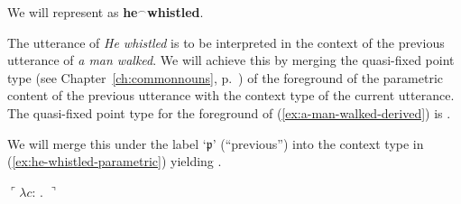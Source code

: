 We will represent \preveg{} as \textbf{he$^{\frown}$whistled}.

The utterance of \textit{He whistled} is to be interpreted in the
context of the previous utterance of \textit{a man walked}.
We will achieve this by merging the quasi-fixed point type (see
Chapter~\ref{ch:commonnouns}, p.~\pageref{ex:quasifixedpointtype}) of
the foreground of the parametric content of the previous utterance with the context type
of the current utterance.  The quasi-fixed point type for the
foreground of 
(\ref{ex:a-man-walked-derived}) is \nexteg{}.
\begin{ex} 
\end{ex} 
We will merge this under the label `$\mathfrak{p}$' (``previous'')
into the context type in (\ref{ex:he-whistled-parametric}) yielding \nexteg{}.
\begin{ex} 
  $\ulcorner\lambda c$:
  . $\urcorner$
\end{ex} 
